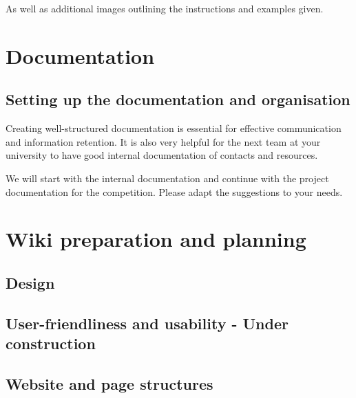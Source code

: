 \documentclass[a4paper, 11pt, twoside]{book}
\begin{document}
As well as additional images outlining the instructions and examples given.

\newpage



\mainmatter
\pagecolor{pgcolor}

\part{Documentation}\label{part:documentation}


\chapter{Setting up the documentation and organisation}\label{ch:setting-up-the-documentation-and-organisation}
Creating well-structured documentation is essential for effective communication and information retention.
It is also very helpful for the next team at your university to have good internal documentation of contacts and
resources.

We will start with the internal documentation and continue with the project documentation for the competition.
Please adapt the suggestions to your needs.



\newpage
%
\part{Wiki preparation and planning}\label{part:wiki-preparation-and-planning}


\chapter{Design} \label{ch:design}

\newpage
%
\chapter{User-friendliness and usability - Under construction}\label{ch:user-friendliness-and-usability}

\newpage
%
\chapter{Website and page structures} \label{ch:webstructure}

\newpage
\end{document}
